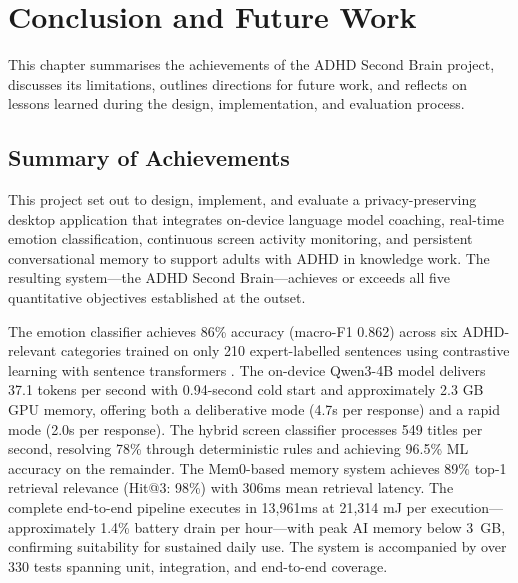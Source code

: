 \chapter{Conclusion and Future Work}
\label{ch:conclusion}

This chapter summarises the achievements of the ADHD Second Brain project, discusses its limitations, outlines directions for future work, and reflects on lessons learned during the design, implementation, and evaluation process.

\section{Summary of Achievements}
\label{sec:summary-achievements}

This project set out to design, implement, and evaluate a privacy-preserving desktop application that integrates on-device language model coaching, real-time emotion classification, continuous screen activity monitoring, and persistent conversational memory to support adults with ADHD in knowledge work. The resulting system---the ADHD Second Brain---achieves or exceeds all five quantitative objectives established at the outset.

The emotion classifier achieves 86\% accuracy (macro-F1 0.862) across six ADHD-relevant categories trained on only 210 expert-labelled sentences using contrastive learning with sentence transformers \cite{reimers2019}. The on-device Qwen3-4B model \cite{hannun2023, yang2025} delivers 37.1 tokens per second with 0.94-second cold start and approximately 2.3 GB GPU memory, offering both a deliberative mode (4.7s per response) and a rapid mode (2.0s per response). The hybrid screen classifier processes 549 titles per second, resolving 78\% through deterministic rules and achieving 96.5\% ML accuracy on the remainder. The Mem0-based memory system achieves 89\% top-1 retrieval relevance (Hit@3: 98\%) with 306ms mean retrieval latency. The complete end-to-end pipeline executes in 13,961ms at 21,314 mJ per execution---approximately 1.4\% battery drain per hour---with peak AI memory below 3~GB, confirming suitability for sustained daily use. The system is accompanied by over 330 tests spanning unit, integration, and end-to-end coverage.

